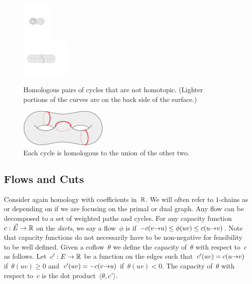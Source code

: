 

\begin{figure}[htb]
\centering
\includegraphics[height=0.75in]{Fig/homologous3}\\[2ex]
\includegraphics[height=0.75in]{Fig/homologous2}
\caption{Homologous pairs of cycles that are not homotopic.  (Lighter portions of the curves are on the back side of the surface.)}
\label{F:homology}
\end{figure}

\begin{figure}[htb]
\centering
\includegraphics[height=0.75in]{Fig/homologous1}
\caption{Each cycle is homologous to the union of the other two.}
\label{F:homology2}
\end{figure}

\subsection{Flows and Cuts}
Consider again homology with coefficients in~$\R$.
We will often refer to $1$-chains as  or  depending on if we are focusing on the primal or dual graph.
Any flow can be decomposed to a set of weighted paths and cycles.
For any capacity function~$c : \vec{E} \to \R$ on the \emph{darts}, we say a flow~$\phi$ is  if $-c(v \mathord{\rightarrow} u) \leq \phi(uv) \leq c(u \mathord{\rightarrow} v)$.
Note that capacity functions do not necessarily have to be non-negative for feasibility to be well defined.
Given a coflow~$\theta$ we define the capacity of~$\theta$ with respect to~$c$ as follows.
Let~$c' : E \to \R$ be a function on the edges such that~$c'(uv) = c(u \mathord{\rightarrow} v)$ if~$\theta(uv) \geq 0$ and~$c'(uv) = -c(v \mathord{\rightarrow} u)$ if~$\theta(uv) < 0$.
The capacity of~$\theta$ with respect to~$c$ is the dot product~$\langle \theta, c' \rangle$.

